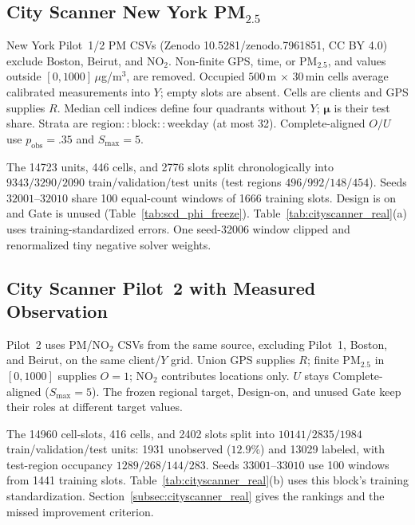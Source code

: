 \subsection{City Scanner New York \texorpdfstring{{PM}$_{2.5}$}{PM2.5}}

New York Pilot~1/2 {PM} CSVs (Zenodo 10.5281/zenodo.7961851, {CC BY}
4.0)~\cite{wang2023cityscanner} exclude Boston, Beirut, and {NO}$_2$.
Non-finite GPS, time, or {PM}$_{2.5}$, and values outside
$[0,1000]$\,$\mu$g/m$^3$, are removed. Occupied $500$\,m $\times$ $30$\,min
cells average calibrated measurements into $Y$; empty slots are absent.
Cells are clients and GPS supplies $R$. Median cell indices define four
quadrants without $Y$; $\boldsymbol\mu$ is their test share. Strata are
$\mathrm{region}{::}\mathrm{block}{::}\mathrm{weekday}$ (at most 32).
Complete-aligned $O/U$ use $p_{\mathrm{obs}}=.35$ and $S_{\max}=5$.

The 14723 units, 446 cells, and 2776 slots split chronologically into
$9343/3290/2090$ train/validation/test units (test regions $496/992/148/454$).
Seeds $32001$--$32010$ share 100 equal-count windows of 1666 training slots.
Design is on and Gate is unused (Table~\ref{tab:scd_phi_freeze}).
Table~\ref{tab:cityscanner_real}(a) uses training-standardized errors. One
seed-32006 window clipped and renormalized tiny negative solver weights.

\subsection{City Scanner Pilot~2 with Measured Observation}

Pilot~2 uses {PM}/{NO}$_2$ CSVs from the same source, excluding Pilot~1,
Boston, and Beirut, on the same client/$Y$ grid. Union GPS supplies $R$;
finite {PM}$_{2.5}$ in $[0,1000]$ supplies $O=1$; {NO}$_2$ contributes
locations only. $U$ stays Complete-aligned ($S_{\max}=5$). The frozen regional
target, Design-on, and unused Gate keep their roles at different target values.

The 14960 cell-slots, 416 cells, and 2402 slots split into
$10141/2835/1984$ train/validation/test units: 1931 unobserved ($12.9\%$) and
13029 labeled, with test-region occupancy $1289/268/144/283$. Seeds
$33001$--$33010$ use 100 windows from 1441 training slots.
Table~\ref{tab:cityscanner_real}(b) uses this block's training standardization.
Section~\ref{subsec:cityscanner_real} gives the rankings and the missed
improvement criterion.

